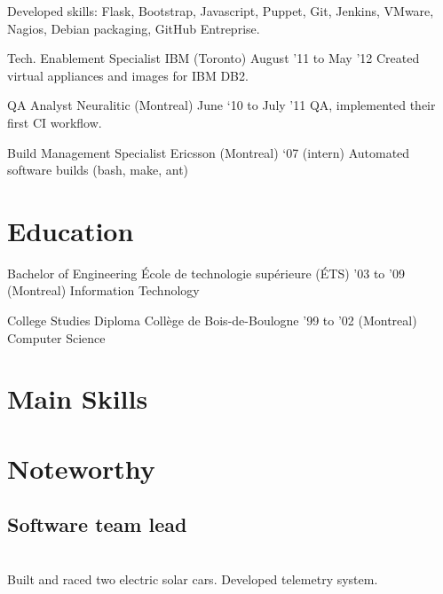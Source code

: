 \documentclass[]{cvpn}
\begin{document}
\begin{multicols}{2}
\begin{eventlist}
{Developed skills: Flask, Bootstrap, Javascript,
Puppet, Git, Jenkins, VMware, Nagios, Debian packaging,
GitHub Entreprise.
}

\item{Tech. Enablement Specialist}
     {IBM (Toronto)}
     {August '11 to May '12}
{
Created virtual appliances and images for IBM DB2.
}

\item{QA Analyst}
     {Neuralitic (Montreal)}
     {June ‘10 to July ’11}
{
QA, implemented their first CI workflow.
}

\item{Build Management Specialist}
     {Ericsson (Montreal)}
     {‘07 (intern)}
{
Automated software builds (bash, make, ant)
}

\end{eventlist}

\section{Education}
\begin{eventlist}

\item{Bachelor of Engineering}
     {École de technologie supérieure (ÉTS)}
     {'03 to '09}
{
(Montreal) Information Technology
}

\item{College Studies Diploma}
     {Collège de Bois-de-Boulogne}
     {'99 to '02}
{
(Montreal) Computer Science
}

\end{eventlist}

\section{Main Skills}
\begin{skillslist}


\end{skillslist}

\section{Noteworthy}

\subsection{Software team lead}
\\
Built and raced two electric solar cars.
Developed telemetry system.\\


\end{multicols}
\end{document}
